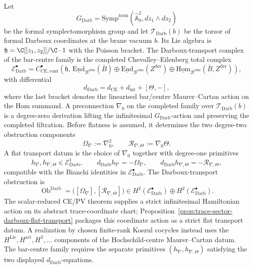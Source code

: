\begin{defn}
Let
\[
  G_{\mathrm{Darb}}
  =
  \mathrm{Symp}^{\mathrm{form}}
  (\widehat{\mathbb A}^{2}_{0},dz_1\wedge dz_2)
\]
be the formal symplectomorphism group and let
\(\mathcal T_{\mathrm{Darb}}(b)\) be the torsor of formal Darboux
coordinates at the brane vacuum \(b\).  Its Lie algebra is
\(\mathfrak h=\C[[z_1,z_2]]/\C\cdot1\) with the Poisson bracket.  The
Darboux-transport complex of the bar-centre family is the completed
Chevalley--Eilenberg total complex
\[
  \mathcal E^\bullet_{\mathrm{Darb}}
  =
  C^\bullet_{\mathrm{CE},\mathrm{cont}}\!\left(
  \mathfrak h,\,
  \underline{\mathrm{End}}_{\mathcal B^{\mathrm{adm}}}(\bar B)
  \oplus
  \underline{\mathrm{End}}_{\mathcal B^{\mathrm{adm}}}(Z^{\mathrm{der}})
  \oplus
  \underline{\mathrm{Hom}}_{\mathcal B^{\mathrm{adm}}}(\bar B,Z^{\mathrm{der}})
  \right),
\]
with differential
\[
  d_{\mathrm{Darb}}
  =
  d_{\mathrm{CE}}+d_{\mathrm{int}}+[\Theta,-],
\]
where the last bracket denotes the linearised bar/centre
Maurer--Cartan action on the Hom summand.  A preconnection
\(\nabla_0\) on the completed family over
\(\mathcal T_{\mathrm{Darb}}(b)\) is a degree-zero derivation lifting the
infinitesimal \(G_{\mathrm{Darb}}\)-action and preserving the completed
filtration.  Before flatness is assumed, it determines the two degree-two
obstruction components
\[
  \Omega_{\nabla}:=\nabla_0^2,\qquad
  \mathcal R_{\nabla,\Theta}:=\nabla_0\Theta .
\]
A flat transport datum is the choice of \(\nabla_0\) together with
degree-one primitives
\[
  h_{\nabla},h_{\nabla,\Theta}\in\mathcal E^1_{\mathrm{Darb}},
  \qquad
  d_{\mathrm{Darb}}h_{\nabla}=-\Omega_{\nabla},
  \qquad
  d_{\mathrm{Darb}}h_{\nabla,\Theta}=-\mathcal R_{\nabla,\Theta},
\]
compatible with the Bianchi identities in
\(\mathcal E^\bullet_{\mathrm{Darb}}\).  The Darboux-transport
obstruction is
\[
  \operatorname{Ob}^{\mathrm{Darb}}
  =
  \bigl([\Omega_{\nabla}],[\mathcal R_{\nabla,\Theta}]\bigr)
  \in
  H^2(\mathcal E^\bullet_{\mathrm{Darb}})
  \oplus H^2(\mathcal E^\bullet_{\mathrm{Darb}}).
\]
The scalar-reduced CE/PV theorem supplies a strict infinitesimal
Hamiltonian action on its abstract trace-coordinate chart;
Proposition~\ref{prop:trace-sector-darboux-flat-transport} packages this
coordinate action as a strict flat transport datum.  A realization by
chosen finite-rank Koszul cocycles instead uses the
\(H^{\mathrm{Lie}},H^{\mathrm{act}},H^3,\ldots\) components of the
Hochschild-centre Maurer--Cartan datum.  The bar-centre family requires
the separate primitives
\((h_{\nabla},h_{\nabla,\Theta})\) satisfying the two displayed
\(d_{\mathrm{Darb}}\)-equations.
\end{defn}

